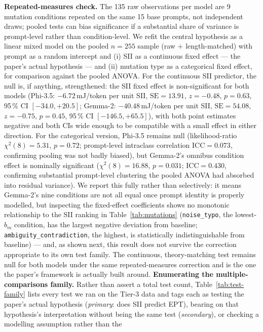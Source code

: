 \documentclass[conference]{IEEEtran}
\begin{document}
\textbf{Repeated-measures check.} The 135 raw observations per model
are 9 mutation conditions repeated on the same 15 base prompts, not
independent draws; pooled tests can bias significance if a substantial
share of variance is prompt-level rather than condition-level. We
refit the central hypothesis as a linear mixed model on the pooled
$n=255$ sample (raw $+$ length-matched) with prompt as a random
intercept and (i) SII as a continuous fixed effect --- the paper's
actual hypothesis --- and (ii) mutation type as a categorical fixed
effect, for comparison against the pooled ANOVA. For the continuous
SII predictor, the null is, if anything, strengthened: the SII fixed
effect is non-significant for both models (Phi-3.5: $-6.72$\,mJ/token
per unit SII, $\mathrm{SE}=13.91$, $z=-0.48$, $p=0.63$, 95\,\% CI
$[-34.0,+20.5]$; Gemma-2: $-40.48$\,mJ/token per unit SII,
$\mathrm{SE}=54.08$, $z=-0.75$, $p=0.45$, 95\,\% CI $[-146.5,+65.5]$),
with both point estimates negative and both CIs wide enough to be
compatible with a small effect in either direction. For the
categorical version, Phi-3.5 remains null (likelihood-ratio
$\chi^2(8)=5.31$, $p=0.72$; prompt-level intraclass correlation
$\mathrm{ICC}=0.073$, confirming pooling was not badly biased), but
Gemma-2's omnibus condition effect is nominally significant
($\chi^2(8)=16.88$, $p=0.031$; $\mathrm{ICC}=0.430$, confirming
substantial prompt-level clustering the pooled ANOVA had absorbed into
residual variance). We report this fully rather than selectively: it
means Gemma-2's nine conditions are not all equal once prompt identity
is properly modelled, but inspecting the fixed-effect coefficients
shows no monotonic relationship to the SII ranking in
Table~\ref{tab:mutations} (\texttt{noise\_typo}, the lowest-$b_m$
condition, has the largest negative deviation from baseline;
\texttt{ambiguity\_contradiction}, the highest, is statistically
indistinguishable from baseline) --- and, as shown next, this result
does not survive the correction appropriate to its own test family.
The continuous, theory-matching test remains null for both models
under the same repeated-measures correction and is the one the
paper's framework is actually built around.
\textbf{Enumerating the multiple-comparisons family.} Rather than
assert a total test count, Table~\ref{tab:test-family} lists every
test we ran on the Tier-3 data and tags each as testing the paper's
actual hypothesis (\emph{primary}: does SII predict EPT), bearing on
that hypothesis's interpretation without being the same test
(\emph{secondary}), or checking a modelling assumption rather than the
\end{document}
